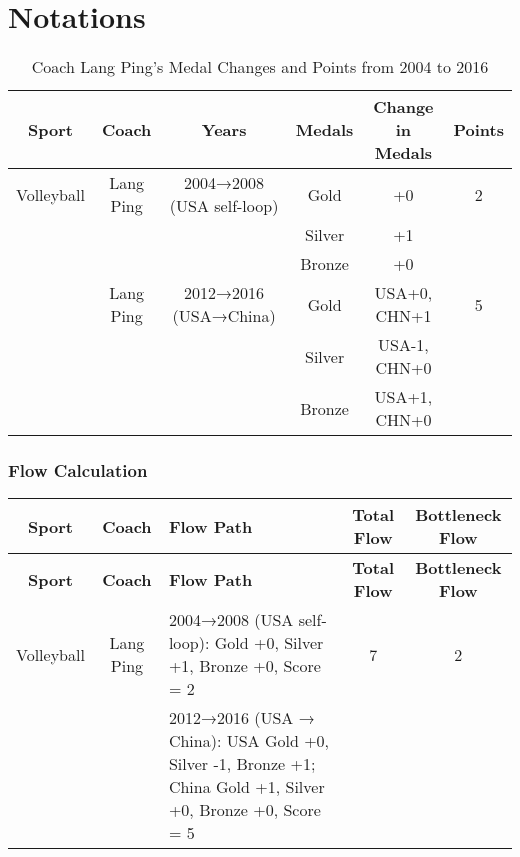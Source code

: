 \documentclass{mcmthesis}
\begin{document}
\section{Notations}




\begin{table}[ht]
    \centering
    \begin{tabular}{|c|c|c|c|c|c|}
    \hline
    \textbf{Sport} & \textbf{Coach} & \textbf{Years} & \textbf{Medals} & \textbf{Change in Medals} & \textbf{Points} \\
    \hline
    Volleyball & Lang Ping & 2004→2008 (USA self-loop) & Gold & +0 & 2 \\
               &             &                           & Silver & +1 &   \\
               &             &                           & Bronze & +0 &   \\
    \hline
               & Lang Ping & 2012→2016 (USA→China) & Gold & USA+0, CHN+1 & 5 \\
               &             &                         & Silver & USA-1, CHN+0 &   \\
               &             &                         & Bronze & USA+1, CHN+0 &   \\
    \hline
    \end{tabular}
    \caption{Coach Lang Ping's Medal Changes and Points from 2004 to 2016}
\end{table}
    
\subsubsection{Flow Calculation}


\begin{longtable}{|c|c|l|c|c|}
\hline
\textbf{Sport} & \textbf{Coach} & \textbf{Flow Path} & \textbf{Total Flow} & \textbf{Bottleneck Flow} \\
\hline
\endfirsthead

\hline
\textbf{Sport} & \textbf{Coach} & \textbf{Flow Path} & \textbf{Total Flow} & \textbf{Bottleneck Flow} \\
\hline
\endhead

\hline
\endfoot

Volleyball & Lang Ping & 2004→2008 (USA self-loop): Gold +0, Silver +1, Bronze +0, Score = 2 & 7 & 2 \\
           &           & 2012→2016 (USA → China): USA Gold +0, Silver -1, Bronze +1; China Gold +1, Silver +0, Bronze +0, Score = 5 & & \\
\hline
\end{longtable}
\end{document}
